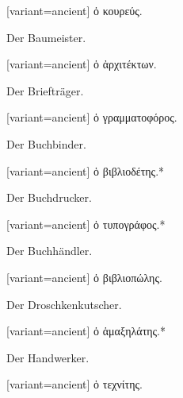 \begin{greek}[variant=ancient]%
ὁ κουρεύς.

\end{greek}%
\switchcolumn*

Der Baumeister.

\switchcolumn

\begin{greek}[variant=ancient]%
ὁ ἀρχιτέκτων.

\end{greek}%
\switchcolumn*

Der Briefträger.

\switchcolumn

\begin{greek}[variant=ancient]%
ὁ γραμματοφόρος.

\end{greek}%
\switchcolumn*

Der Buchbinder.

\switchcolumn

\begin{greek}[variant=ancient]%
ὁ βιβλιοδέτης.{*}

\end{greek}%
\switchcolumn*

Der Buchdrucker.

\switchcolumn

\begin{greek}[variant=ancient]%
ὁ τυπογράφος.{*}

\end{greek}%
\switchcolumn*

Der Buchhändler.

\switchcolumn

\begin{greek}[variant=ancient]%
ὁ βιβλιοπώλης.

\end{greek}%
\switchcolumn*

Der Droschkenkutscher.

\switchcolumn

\begin{greek}[variant=ancient]%
ὁ ἁμαξηλάτης.{*}

\end{greek}%
\switchcolumn*

Der Handwerker.

\switchcolumn

\begin{greek}[variant=ancient]%
ὁ τεχνίτης.

\end{greek}%
\switchcolumn*

